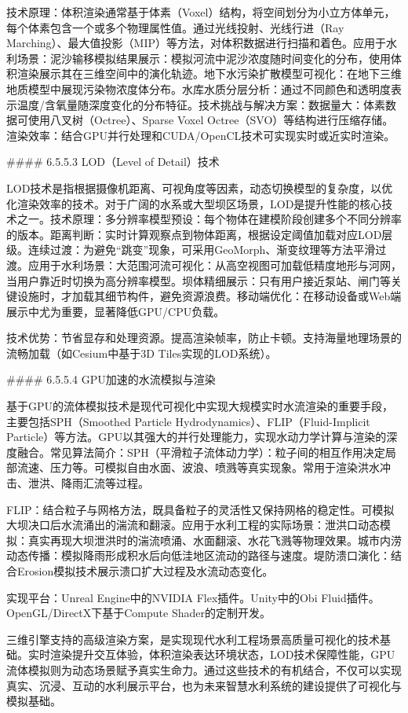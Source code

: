 技术原理：体积渲染通常基于体素（Voxel）结构，将空间划分为小立方体单元，每个体素包含一个或多个物理属性值。通过光线投射、光线行进（Ray Marching）、最大值投影（MIP）等方法，对体积数据进行扫描和着色。应用于水利场景：泥沙输移模拟结果展示：模拟河流中泥沙浓度随时间变化的分布，使用体积渲染展示其在三维空间中的演化轨迹。地下水污染扩散模型可视化：在地下三维地质模型中展现污染物浓度体分布。水库水质分层分析：通过不同颜色和透明度表示温度/含氧量随深度变化的分布特征。技术挑战与解决方案：数据量大：体素数据可使用八叉树（Octree）、Sparse Voxel Octree（SVO）等结构进行压缩存储。渲染效率：结合GPU并行处理和CUDA/OpenCL技术可实现实时或近实时渲染。

\#\#\#\# 6.5.5.3 LOD（Level of Detail）技术

LOD技术是指根据摄像机距离、可视角度等因素，动态切换模型的复杂度，以优化渲染效率的技术。对于广阔的水系或大型坝区场景，LOD是提升性能的核心技术之一。技术原理：多分辨率模型预设：每个物体在建模阶段创建多个不同分辨率的版本。距离判断：实时计算观察点到物体距离，根据设定阈值加载对应LOD层级。连续过渡：为避免``跳变''现象，可采用GeoMorph、渐变纹理等方法平滑过渡。应用于水利场景：大范围河流可视化：从高空视图可加载低精度地形与河网，当用户靠近时切换为高分辨率模型。坝体精细展示：只有用户接近泵站、闸门等关键设施时，才加载其细节构件，避免资源浪费。移动端优化：在移动设备或Web端展示中尤为重要，显著降低GPU/CPU负载。

技术优势：节省显存和处理资源。提高渲染帧率，防止卡顿。支持海量地理场景的流畅加载（如Cesium中基于3D Tiles实现的LOD系统）。

\#\#\#\# 6.5.5.4 GPU加速的水流模拟与渲染

基于GPU的流体模拟技术是现代可视化中实现大规模实时水流渲染的重要手段，主要包括SPH（Smoothed Particle Hydrodynamics）、FLIP（Fluid-Implicit Particle）等方法。GPU以其强大的并行处理能力，实现水动力学计算与渲染的深度融合。常见算法简介：SPH（平滑粒子流体动力学）：粒子间的相互作用决定局部流速、压力等。可模拟自由水面、波浪、喷溅等真实现象。常用于渲染洪水冲击、泄洪、降雨汇流等过程。

FLIP：结合粒子与网格方法，既具备粒子的灵活性又保持网格的稳定性。可模拟大坝决口后水流涌出的湍流和翻滚。应用于水利工程的实际场景：泄洪口动态模拟：真实再现大坝泄洪时的湍流喷涌、水面翻滚、水花飞溅等物理效果。城市内涝动态传播：模拟降雨形成积水后向低洼地区流动的路径与速度。堤防溃口演化：结合Erosion模拟技术展示溃口扩大过程及水流动态变化。

实现平台：Unreal Engine中的NVIDIA Flex插件。Unity中的Obi Fluid插件。OpenGL/DirectX下基于Compute Shader的定制开发。

三维引擎支持的高级渲染方案，是实现现代水利工程场景高质量可视化的技术基础。实时渲染提升交互体验，体积渲染表达环境状态，LOD技术保障性能，GPU流体模拟则为动态场景赋予真实生命力。通过这些技术的有机结合，不仅可以实现真实、沉浸、互动的水利展示平台，也为未来智慧水利系统的建设提供了可视化与模拟基础。


